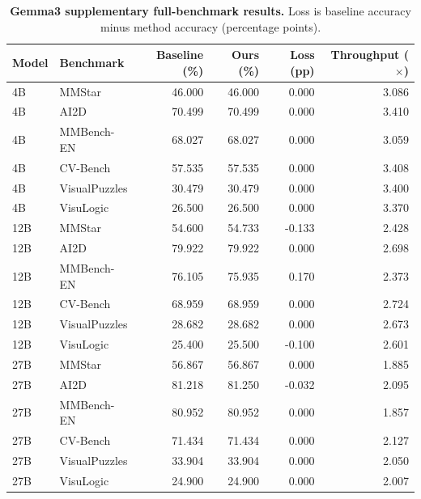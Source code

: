 \documentclass[10pt,a4paper,landscape]{article}
\newcommand{\tnote}[1]{\par\vspace{3pt}{\footnotesize #1}\par}
\begin{document}
\clearpage
\begin{table}[!ht]\centering
\caption{\textbf{Gemma3 supplementary full-benchmark results.} Loss is baseline accuracy minus method accuracy (percentage points).}
\small
\begin{tabular}{@{}llrrrr@{}}\toprule
Model & Benchmark & Baseline (\%) & Ours (\%) & Loss (pp) & Throughput ($\times$)\\\midrule
4B & MMStar & 46.000 & 46.000 & 0.000 & 3.086\\
4B & AI2D & 70.499 & 70.499 & 0.000 & 3.410\\
4B & MMBench-EN & 68.027 & 68.027 & 0.000 & 3.059\\
4B & CV-Bench & 57.535 & 57.535 & 0.000 & 3.408\\
4B & VisualPuzzles & 30.479 & 30.479 & 0.000 & 3.400\\
4B & VisuLogic & 26.500 & 26.500 & 0.000 & 3.370\\
\midrule
12B & MMStar & 54.600 & 54.733 & -0.133 & 2.428\\
12B & AI2D & 79.922 & 79.922 & 0.000 & 2.698\\
12B & MMBench-EN & 76.105 & 75.935 & 0.170 & 2.373\\
12B & CV-Bench & 68.959 & 68.959 & 0.000 & 2.724\\
12B & VisualPuzzles & 28.682 & 28.682 & 0.000 & 2.673\\
12B & VisuLogic & 25.400 & 25.500 & -0.100 & 2.601\\
\midrule
27B & MMStar & 56.867 & 56.867 & 0.000 & 1.885\\
27B & AI2D & 81.218 & 81.250 & -0.032 & 2.095\\
27B & MMBench-EN & 80.952 & 80.952 & 0.000 & 1.857\\
27B & CV-Bench & 71.434 & 71.434 & 0.000 & 2.127\\
27B & VisualPuzzles & 33.904 & 33.904 & 0.000 & 2.050\\
27B & VisuLogic & 24.900 & 24.900 & 0.000 & 2.007\\
\bottomrule\end{tabular}
\tnote{Inputs remain at 896 pixels with BF16 and all layers. The method combines B2 graph execution, CPU input pipelining, and normalization-related fusion against a serial HF baseline. Ratios describe request-stream throughput, not single-request latency or matched-batch kernel gains. Only the complete 27B rerun is used; the earlier OOM cell is invalid. Equal accuracy does not mean identical predictions. MMBench-EN uses provided-pass group accuracy, not full official CircularEval; 53 groups are incomplete. CV-Bench uses source-balanced accuracy; the other benchmarks use forced-choice exact accuracy. Three repetitions are timing replicates, not independent training seeds.}
\end{table}
\end{document}
